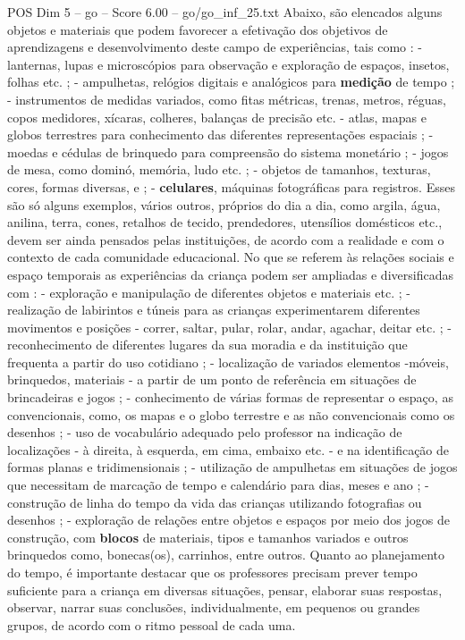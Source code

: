 \begin{textsample}{POS Dim 5 – go – Score 6.00 – go/go\_inf\_25.txt}
Abaixo, são elencados alguns objetos e materiais que podem favorecer a efetivação dos objetivos de aprendizagens e desenvolvimento deste campo de experiências, tais como : - lanternas, lupas e microscópios para observação e exploração de espaços, insetos, folhas etc. ; - ampulhetas, relógios digitais e analógicos para \textbf{medição} de tempo ; - instrumentos de medidas variados, como fitas métricas, trenas, metros, réguas, copos medidores, xícaras, colheres, balanças de precisão etc. - atlas, mapas e globos terrestres para conhecimento das diferentes representações espaciais ; - moedas e cédulas de brinquedo para compreensão do sistema monetário ; - jogos de mesa, como dominó, memória, ludo etc. ; - objetos de tamanhos, texturas, cores, formas diversas, e ; - \textbf{celulares}, máquinas fotográficas para registros.
Esses são só alguns exemplos, vários outros, próprios do dia a dia, como argila, água, anilina, terra, cones, retalhos de tecido, prendedores, utensílios domésticos etc., devem ser ainda pensados pelas instituições, de acordo com a realidade e com o contexto de cada comunidade educacional.
No que se referem às relações sociais e espaço temporais as experiências da criança podem ser ampliadas e diversificadas com : - exploração e manipulação de diferentes objetos e materiais etc. ; - realização de labirintos e túneis para as crianças experimentarem diferentes movimentos e posições - correr, saltar, pular, rolar, andar, agachar, deitar etc. ; - reconhecimento de diferentes lugares da sua moradia e da instituição que frequenta a partir do uso cotidiano ; - localização de variados elementos -móveis, brinquedos, materiais - a partir de um ponto de referência em situações de brincadeiras e jogos ; - conhecimento de várias formas de representar o espaço, as convencionais, como, os mapas e o globo terrestre e as não convencionais como os desenhos ; - uso de vocabulário adequado pelo professor na indicação de localizações - à direita, à esquerda, em cima, embaixo etc. - e na identificação de formas planas e tridimensionais ; - utilização de ampulhetas em situações de jogos que necessitam de marcação de tempo e calendário para dias, meses e ano ; - construção de linha do tempo da vida das crianças utilizando fotografias ou desenhos ; - exploração de relações entre objetos e espaços por meio dos jogos de construção, com \textbf{blocos} de materiais, tipos e tamanhos variados e outros brinquedos como, bonecas(os), carrinhos, entre outros.
Quanto ao planejamento do tempo, é importante destacar que os professores precisam prever tempo suficiente para a criança em diversas situações, pensar, elaborar suas respostas, observar, narrar suas conclusões, individualmente, em pequenos ou grandes grupos, de acordo com o ritmo pessoal de cada uma.

\end{textsample}
